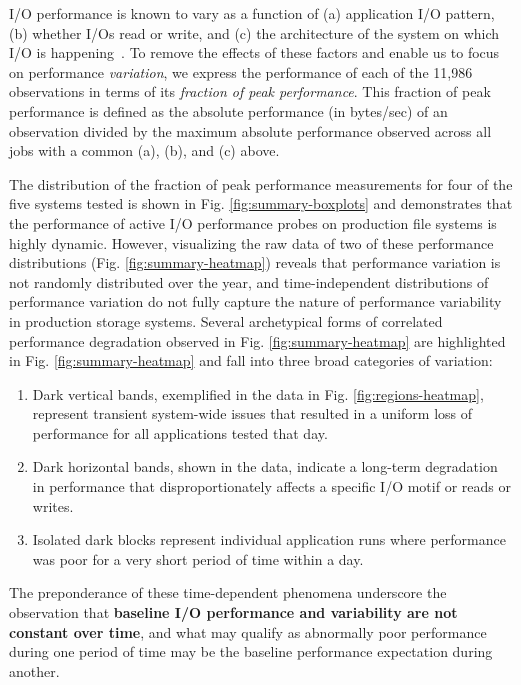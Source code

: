 I/O performance is known to vary as a function of (a) application I/O pattern, (b) whether I/Os read or write, and (c) the architecture of the system on which I/O is happening~\cite{Lockwood2017, Xie2012}.
To remove the effects of these factors and enable us to focus on performance \emph{variation}, we express the performance of each of the 11,986 observations in terms of its \emph{fraction of peak performance}.
This fraction of peak performance is defined as the absolute performance (in bytes/sec) of an observation divided by the maximum absolute performance observed across all jobs with a common (a), (b), and (c) above.

The distribution of the fraction of peak performance measurements for four of the five systems tested is shown in Fig. \ref{fig:summary-boxplots} and demonstrates that the performance of active I/O performance probes on production file systems is highly dynamic.
However, visualizing the raw data of two of these performance distributions (Fig. \ref{fig:summary-heatmap}) reveals that performance variation is not randomly distributed over the year, and time-independent distributions of performance variation do not fully capture the nature of performance variability in production storage systems.
Several archetypical forms of correlated performance degradation observed in Fig. \ref{fig:summary-heatmap} are highlighted in Fig. \ref{fig:summary-heatmap} and fall into three broad categories of variation:

\begin{enumerate}[leftmargin=*]
\item Dark vertical bands, exemplified in the \mira data in Fig. \ref{fig:regions-heatmap}, represent transient system-wide issues that resulted in a uniform loss of performance for all applications tested that day.
\item Dark horizontal bands, shown in the \cori data, indicate a long-term degradation in performance that disproportionately affects a specific I/O motif or reads or writes.
\item Isolated dark blocks represent individual application runs where performance was poor for a very short period of time within a day.
\end{enumerate}

The preponderance of these time-dependent phenomena underscore the observation that \textbf{baseline I/O performance and variability are not constant over time}, and
what may qualify as abnormally poor performance during one period of time may be the baseline performance expectation during another.

